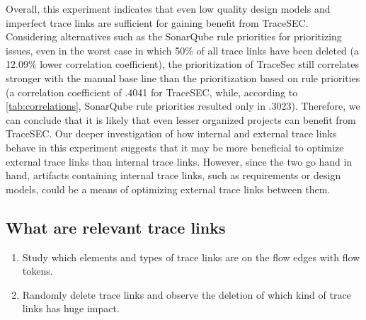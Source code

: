 Overall, this experiment indicates that even low quality design models and imperfect trace links are sufficient for gaining benefit from TraceSEC.
Considering alternatives such as the SonarQube rule priorities for prioritizing issues, even in the worst case in which 50\% of all trace links have been deleted (a 12.09\% lower correlation coefficient), the prioritization of TraceSec still correlates stronger with the manual base line than the prioritization based on rule priorities (a correlation coefficient of .4041 for TraceSEC, while, according to \autoref{tab:correlations}, SonarQube rule priorities resulted only in .3023).
Therefore, we can conclude that it is likely that even lesser organized projects can benefit from TraceSEC.
Our deeper investigation of how internal and external trace links behave in this experiment suggests that it may be more beneficial to optimize external trace links than internal trace links.
However, since the two go hand in hand, artifacts containing internal trace links, such as requirements or design models, could be a means of optimizing external trace links between them.


\subsection{What are relevant trace links}

\begin{enumerate}
	\item Study which elements and types of trace links are on the flow edges with flow tokens.
	\item Randomly delete trace links and observe the deletion of which kind of trace links has huge impact.
\end{enumerate}

